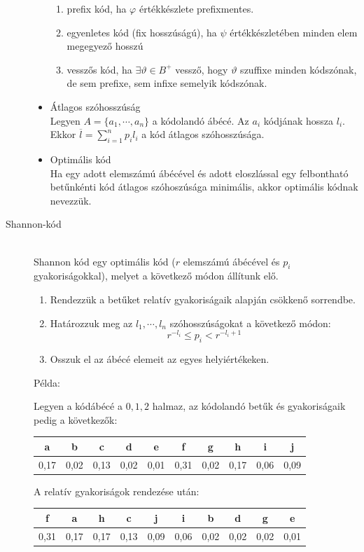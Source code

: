 \documentclass[margin=0px]{article}
\begin{document}
\begin{description}
\begin{itemize}
\begin{enumerate}
								\item prefix kód, ha $\varphi$ értékkészlete prefixmentes.
								\item egyenletes kód (fix hosszúságú), ha $\psi$ értékkészletében minden elem megegyező hosszú
								\item vesszős kód, ha $\exists \vartheta \in B^+$ vessző, hogy $\vartheta$ szuffixe minden kódszónak, de sem prefixe, sem infixe semelyik kódszónak.
							\end{enumerate}
						\item Átlagos szóhosszúság \\
							Legyen $A = \{a_1,\cdots, a_n\}$ a kódolandó ábécé. Az $a_i$ kódjának hossza $l_i$. Ekkor $\overline{l} = \sum_{i=1}^{n}p_il_i$ a kód átlagos szóhosszúsága.
						\item Optimális kód \\
							Ha egy adott elemszámú ábécével és adott eloszlással egy felbontható betűnkénti kód átlagos szóhoszúsága minimális, akkor optimális kódnak nevezzük.
					\end{itemize}
				\item[Shannon-kód] \hfill \\
					Shannon kód egy optimális kód ($r$ elemszámú ábécével és $p_i$ gyakoriságokkal), melyet a következő módon állítunk elő.
					\begin{enumerate}
						\item Rendezzük a betűket relatív gyakoriságaik alapján csökkenő sorrendbe.
						\item Határozzuk meg az $l_1,\cdots,l_n$ szóhosszúságokat a következő módon:
							\[r^{-l_i} \leq p_i < r^{-l_i+1} \]
						\item Osszuk el az ábécé elemeit az egyes helyiértékeken.
					\end{enumerate}
					Példa:
					
					Legyen a kódábécé a ${0,1,2}$ halmaz, az kódolandó betűk és gyakoriságaik pedig a következők:
					
					\begin{tabular}{|c|c|c|c|c|c|c|c|c|c|}
						\hline a & b & c & d & e & f & g & h & i & j \\ 
						\hline 0,17 & 0,02 & 0,13 & 0,02 & 0,01 & 0,31 & 0,02 & 0,17 & 0,06 & 0,09 \\ 
						\hline 
					\end{tabular} 
					
					A relatív gyakoriságok rendezése után:
					
					\begin{tabular}{|c|c|c|c|c|c|c|c|c|c|}
						\hline f & a & h & c & j & i & b & d & g & e \\ 
						\hline 0,31 & 0,17 & 0,17 & 0,13 & 0,09 & 0,06 & 0,02 & 0,02 & 0,02 & 0,01 \\ 
						\hline 
					\end{tabular} 
					

\end{description}
\end{document}
